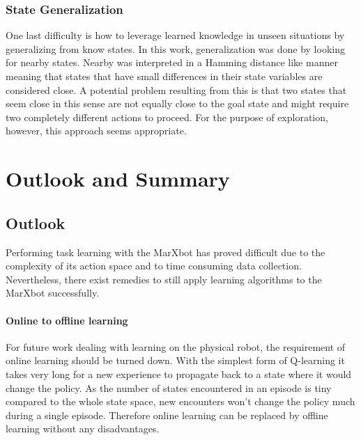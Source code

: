 \subsection{State Generalization}
One last difficulty is how to leverage learned knowledge in unseen situations by generalizing from know states. In this work, generalization was done by looking for nearby states. Nearby was interpreted in a Hamming distance like manner meaning that states that have small differences in their state variables are considered close. A potential problem resulting from this is that two states that seem close in this sense are not equally close to the goal state and might require two completely different actions to proceed. For the purpose of exploration, however, this approach seems appropriate.


\chapter{Outlook and Summary}

\section{Outlook}
Performing task learning with the MarXbot has proved difficult due to the complexity of its action space and to time consuming data collection. Nevertheless, there exist remedies to still apply learning algorithms to the MarXbot successfully.

\subsubsection{Online to offline learning}
For future work dealing with learning on the physical robot, the requirement of online learning should be turned down. With the simplest form of Q-learning it takes very long for a new experience to propagate back to a state where it would change the policy. As the number of states encountered in an episode is tiny compared to the whole state space, new encounters won't change the policy much during a single episode. Therefore online learning can be replaced by offline learning without any disadvantages.

